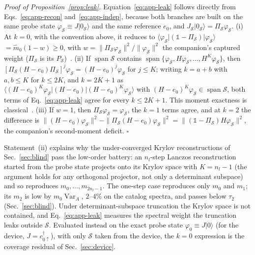 \documentclass[submission, PhysCore]{SciPost}
\newcommand{\openone}{\mathds{1}}%
\begin{document}
\begin{appendix}
\emph{Proof of Proposition~\ref{prop:leak}.} Equation~\eqref{eq:app-leak} follows directly from Eqs.~\eqref{eq:app-recon} and~\eqref{eq:app-indep}, because both branches are built on the same probe state $\varphi_\mathcal{S}\equiv J|0_\mathcal{S}\rangle$ and the same reference $e_0$, and $J_\mathcal S|0_\mathcal S\rangle=\Pi_\mathcal S\varphi_\mathcal S$. (i) At $k=0$, with the convention above, it reduces to ${\langle\varphi_\mathcal{S}|(\openone-\Pi_\mathcal{S})|\varphi_\mathcal{S}\rangle}$\allowbreak${{}=\widehat m_0(1-w)\ge0}$, with ${w=\|\Pi_\mathcal{S}\varphi_\mathcal{S}\|^2/\|\varphi_\mathcal{S}\|^2}$ the companion's captured weight ($\Pi_\mathcal{S}$ is its $P_\mathcal{S}$)~\cite{SQDspec2608}. (ii) If $\operatorname{span}\mathcal{S}$ contains $\operatorname{span}\{\varphi_\mathcal{S},H\varphi_\mathcal{S},\dots,H^K\varphi_\mathcal{S}\}$, then ${[\Pi_\mathcal{S}(H-e_0)\Pi_\mathcal{S}]^j\varphi_\mathcal{S}=(H-e_0)^j\varphi_\mathcal{S}}$ for $j\le K$; writing $k=a+b$ with $a,b\le K$ for $k\le2K$, and $k=2K+1$ as $\langle(H-e_0)^K\varphi_\mathcal S|(H-e_0)|(H-e_0)^K\varphi_\mathcal S\rangle$ with $(H-e_0)^K\varphi_\mathcal S\in\operatorname{span}\mathcal S$, both terms of Eq.~\eqref{eq:app-leak} agree for every $k\le 2K+1$. This moment exactness is classical~\cite{Lanczos1950,GM2010}. (iii) If $w=1$, then $\Pi_\mathcal S\varphi_\mathcal S=\varphi_\mathcal S$, the $k=1$ terms agree, and at $k=2$ the difference is $\|(H-e_0)\varphi_\mathcal S\|^2-\|\Pi_\mathcal S(H-e_0)\varphi_\mathcal S\|^2=\|(\openone-\Pi_\mathcal{S})H\varphi_\mathcal{S}\|^2$, the companion's second-moment deficit. $\square$

Statement~(ii) explains why the under-converged Krylov reconstructions of Sec.~\ref{sec:blind} pass the low-order battery: an $n_l$-step Lanczos reconstruction started from the probe state projects onto its Krylov space with $K=n_l-1$ (the argument holds for any orthogonal projector, not only a determinant subspace) and so reproduces $m_0,\dots,m_{2n_l-1}$. The one-step case reproduces only $m_0$ and $m_1$; its $m_2$ is low by $m_0\operatorname{Var}_A$, $2$--$4\%$ on the catalog spectra, and passes below $\tau_2$ (Sec.~\ref{sec:blind}). Under determinant-subspace truncation the Krylov space is not contained, and Eq.~\eqref{eq:app-leak} measures the spectral weight the truncation leaks outside $\mathcal{S}$. Evaluated instead on the exact probe state $\varphi_0\equiv J|0\rangle$ (for the device, $J=c^\dagger_{0\uparrow}$), with only $\mathcal{S}$ taken from the device, the $k=0$ expression is the coverage residual of Sec.~\ref{sec:device}.


\end{appendix}
\end{document}
